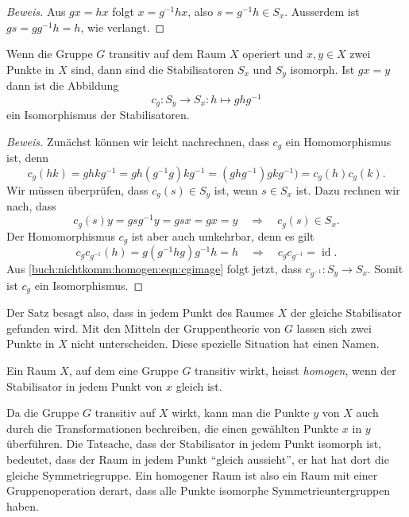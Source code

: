 \begin{proof}[Beweis]
Aus $gx=hx$ folgt $x=g^{-1}hx$, also $s=g^{-1}h\in S_x$.
Ausserdem ist $gs=gg^{-1}h=h$, wie verlangt.
\end{proof}

\begin{satz}
Wenn die Gruppe $G$ transitiv auf dem Raum $X$ operiert und $x,y\in X$
zwei Punkte in $X$ sind, dann sind die Stabilisatoren $S_x$ und $S_y$
isomorph.
Ist $gx=y$ dann ist die Abbildung
\[
c_g\colon
S_y\to S_x: h\mapsto ghg^{-1}
\]
ein Isomorphismus der Stabilisatoren.
\end{satz}

\begin{proof}[Beweis]
Zunächst können wir leicht nachrechnen, dass $c_g$ ein Homomorphismus ist,
denn
\[
c_g(hk)
=
ghkg^{-1}
=
gh(g^{-1}g)kg^{-1}
=
(ghg^{-1})gkg^{-1})
=
c_g(h)c_g(k).
\]
Wir müssen überprüfen, dass $c_g(s)\in S_y$ ist, wenn $s\in S_x$ ist.
Dazu rechnen wir nach, dass
\begin{equation}
c_g(s)y = gsg^{-1} y = gsx=gx=y
\quad\Rightarrow\quad
c_g(s)\in S_x.
\label{buch:nichtkomm:homogen:eqn:cgimage}
\end{equation}
Der Homomorphismus $c_g$ ist aber auch umkehrbar, denn es gilt
\[
c_gc_{g^{-1}}(h)
=
g(g^{-1}hg)g^{-1}h
=
h
\quad\Rightarrow\quad
c_gc_{g^{-1}}=\operatorname{id}.
\]
Aus \eqref{buch:nichtkomm:homogen:eqn:cgimage} folgt jetzt, dass
$c_{g^{-1}}\colon S_y\to S_x$.
Somit ist $c_g$ ein Isomorphismus.
\end{proof}

Der Satz besagt also, dass in jedem Punkt des Raumes $X$ der gleiche
Stabilisator gefunden wird.
Mit den  Mitteln der Gruppentheorie von $G$ lassen sich zwei Punkte 
in $X$ nicht unterscheiden.
Diese spezielle Situation hat einen Namen.

\begin{definition}
Ein Raum $X$, auf dem eine Gruppe $G$ transitiv wirkt, heisst
{\em homogen}, wenn der Stabilisator in jedem Punkt von $x$ gleich ist.
%
%
\end{definition}

Da die Gruppe $G$ transitiv auf $X$ wirkt, kann man die Punkte $y$ von 
$X$ auch durch die Transformationen bechreiben, die einen gewählten
Punkte $x$ in $y$ überführen.
Die Tatsache, dass der Stabilisator in jedem Punkt isomorph ist, 
bedeutet, dass der Raum in jedem Punkt ``gleich aussieht'', er hat
hat dort die gleiche Symmetriegruppe.
Ein homogener Raum ist also ein Raum mit einer Gruppenoperation derart,
dass alle Punkte isomorphe Symmetrieuntergruppen haben.

